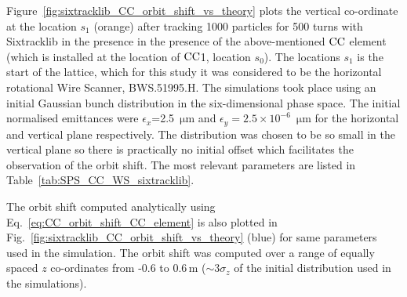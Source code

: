 Figure~\ref{fig:sixtracklib_CC_orbit_shift_vs_theory} plots the vertical co-ordinate at the location $s_1$ (orange) after tracking 1000 particles for 500 turns with Sixtracklib in the presence in the presence of the above-mentioned ${\mathrm{CC}}$ element (which is installed at the location of ${\mathrm{CC}}$1, location $s_0$). The locations $s_1$ is the start of the lattice, which for this study it was considered to be the horizontal rotational Wire Scanner, BWS.51995.H. %
The simulations took place using an initial Gaussian bunch distribution in the six-dimensional phase space. The initial normalised emittances were $\epsilon_x$=2.5\, $\mathrm{\mu m}$ and $\epsilon_y=2.5 \times 10^{-6}$\, $\mathrm{\mu m}$ for the horizontal and vertical plane respectively. The distribution was chosen to be so small in the vertical plane so there is practically no initial offset which facilitates the observation of the orbit shift. The most relevant parameters are listed in  Table~\ref{tab:SPS_CC_WS_sixtracklib}. 

The orbit shift computed analytically using Eq.~\eqref{eq:CC_orbit_shift_CC_element} is also plotted in Fig.~\ref{fig:sixtracklib_CC_orbit_shift_vs_theory} (blue) for same parameters used in the simulation. The orbit shift was computed over a range of equally spaced $z$ co-ordinates from -0.6 to 0.6\,m ($\sim 3 \sigma_z$ of the initial distribution used in the simulations). 




